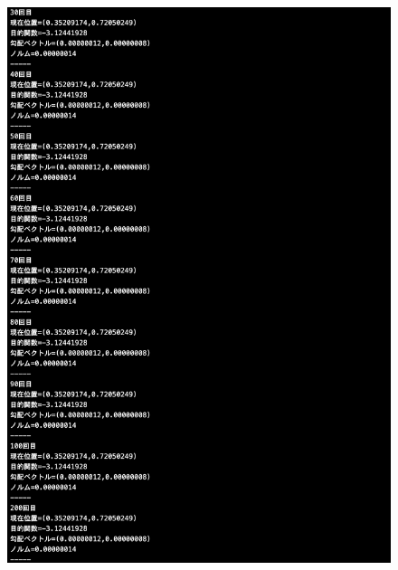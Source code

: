 \documentclass[12pt]{jarticle}
\begin{document}
\begin{figure}[h]
\begin{minipage}{0.5\hsize}
\begin{center}
            \includegraphics[scale=0.2]{kadai1_1s_out2_3_2.png}
        \end{center}
    \end{minipage}
    \begin{minipage}{0.5\hsize}
        \begin{center}

\end{center}
\end{minipage}
\end{figure}
\end{document}
